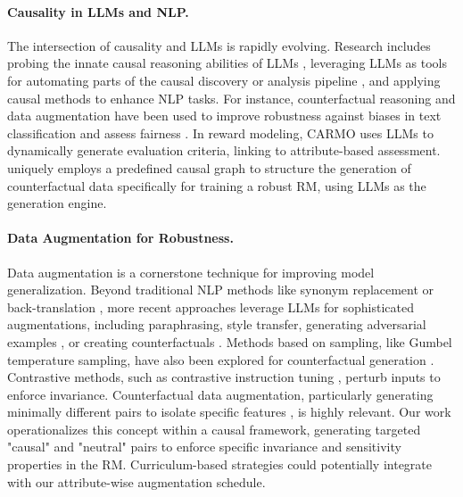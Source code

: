 \paragraph{Causality in LLMs and NLP.}
The intersection of causality and LLMs is rapidly evolving. Research includes probing the innate causal reasoning abilities of LLMs \citep{kiciman2023causal, chi2024unveiling}, leveraging LLMs as tools for automating parts of the causal discovery or analysis pipeline \citep{long2023causal, tu2023causal}, and applying causal methods to enhance NLP tasks. For instance, counterfactual reasoning and data augmentation have been used to improve robustness against biases in text classification \citep{kaushik2019learning, kaushik2020cda, qian2023counterfactual, feder2021causalm} and assess fairness \citep{feder2022causal}. In reward modeling, CARMO \citep{gupta2025carmodynamiccriteriageneration, gupta2025carmo} uses LLMs to dynamically generate evaluation criteria, linking to attribute-based assessment. \carma{} uniquely employs a predefined causal graph to structure the generation of counterfactual data specifically for training a robust RM, using LLMs as the generation engine.

\paragraph{Data Augmentation for Robustness.}
Data augmentation is a cornerstone technique for improving model generalization. Beyond traditional NLP methods like synonym replacement or back-translation \citep{wu2025rewordbench}, more recent approaches leverage LLMs for sophisticated augmentations, including paraphrasing, style transfer, generating adversarial examples \citep{qiang2024prompt}, or creating counterfactuals \citep{mishra2024llm, feder2021causalm, yang2021causalcnn}. Methods based on sampling, like Gumbel temperature sampling, have also been explored for counterfactual generation \citep{ravfogel2025gumbelcounterfactualgenerationlanguage}. Contrastive methods, such as contrastive instruction tuning \citep{shen2023contrastive}, perturb inputs to enforce invariance. Counterfactual data augmentation, particularly generating minimally different pairs to isolate specific features \citep{kaushik2019learning}, is highly relevant. Our work operationalizes this concept within a causal framework, generating targeted "causal" and "neutral" pairs to enforce specific invariance and sensitivity properties in the RM. Curriculum-based strategies \citep{gou2023curriculum} could potentially integrate with our attribute-wise augmentation schedule.

